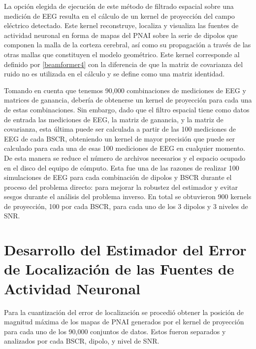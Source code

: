 La opción elegida de ejecución de este método de filtrado espacial sobre una medición de EEG resulta en el cálculo de un kernel de proyección del campo eléctrico detectado.
Este kernel reconstruye, localiza y visualiza las fuentes de actividad neuronal en forma de mapas del PNAI sobre la serie de dipolos que componen la malla de la corteza cerebral, así como su propagación a través de las otras mallas que constituyen el modelo geométrico.
Este kernel corresponde al definido por \cref{beamformer4} con la diferencia de que la matriz de covarianza del ruido no es utilizada en el cálculo y se define como una matriz identidad.

Tomando en cuenta que tenemos 90,000 combinaciones de mediciones de EEG y matrices de ganancia, debería de obtenerse un kernel de proyección para cada una de estas combinaciones.
Sin embargo, dado que el filtro espacial tiene como datos de entrada las mediciones de EEG, la matriz de ganancia, y la matriz de covarianza, esta última puede ser calculada a partir de las 100 mediciones de EEG de cada BSCR, obteniendo un kernel de mayor precisión que puede ser calculado para cada una de esas 100 mediciones de EEG en cualquier momento. 
De esta manera se reduce el número de archivos necesarios y el espacio ocupado en el disco del equipo de cómputo.
Esta fue una de las razones de realizar 100 simulaciones de EEG para cada combinación de dipolos y BSCR durante el proceso del problema directo: para mejorar la robustez del estimador y evitar sesgos durante el análisis del problema inverso.
En total se obtuvieron 900 kernels de proyección, 100 por cada BSCR, para cada uno de los 3 dipolos y 3 niveles de SNR.

\section{Desarrollo del Estimador del Error de Localización de las Fuentes de Actividad Neuronal}
\label{sec:methodology:estimator}

Para la cuantización del error de localización se procedió obtener la posición de magnitud máxima de los mapas de PNAI generados por el kernel de proyección para cada uno de los 90,000 conjuntos de datos. 
Estos fueron separados y analizados por cada BSCR, dipolo, y nivel de SNR.

